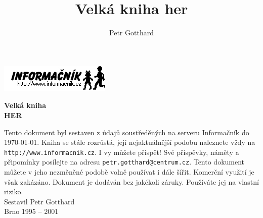 \documentclass[10pt,twoside]{book}
\author{Petr Gotthard}
\title{Velká kniha her}
\begin{document}
\titlepage

{\raggedleft
\includegraphics{inflogo}\\[3 cm]
}

{\centering
{
 \fontsize{2 cm}{2.4 cm}%
 \bfseries%
 Velká kniha
}\\[5mm]
{
 \fontsize{5.5 cm}{6.6 cm}%
 \bfseries%
 HER
}\\[8.5cm]
}

Tento dokument byl sestaven z údajů soustředěných na serveru
Informačník do \today. Kniha se stále rozrůstá, její nejaktuálnější
podobu naleznete vždy na
{\tt http://www.informacnik.cz}.
I vy můžete přispět! Své příspěvky, náměty a připomínky posílejte na adresu
{\tt petr.gotthard@centrum.cz}.
Tento dokument můžete v jeho nezměněné podobě volně používat i dále šířit. 
Komerční využití je však zakázáno.
Dokument je dodáván bez jakékoli záruky. Používáte jej na vlastní
riziko.\\[1 cm]

{\centering
Sestavil Petr Gotthard\\
Brno 1995 -- 2001\\
}

\cleardoublepage

\renewcommand\multicolumntoc{2}
\tableofcontents
\cleardoublepage

\renewcommand\Large{\fontfamily{phv}\fontsize{10}{12}\selectfont}
\renewcommand\large{\fontfamily{phv}\fontsize{7}{8.4}\selectfont}


\newcommand{\nadpis}[2]{%
 \vskip 3ex%
 \addtocounter{#2}{1}%
 \noindent%
 {
  \fontfamily{phv}%
  \fontsize{7}{8.4}%
  \bfseries%
  \arabic{#2}.%
  \hspace{1.5mm}#1%
 }%
 \nopagebreak%
 \vskip 1ex%
}

\newenvironment{intabular}[1]{%
 \noindent%
 \begin{tabular}{#1}%
}{%
 \end{tabular}%
}

\newenvironment{intabularx}[1]{%
 \noindent%
 \tabularx{\columnwidth}{#1}%
}{%
 \endtabularx%
}

\newcommand{\napsal}[1]{%
 \noindent%
 {\em Napsal #1.}%
}
\end{document}
